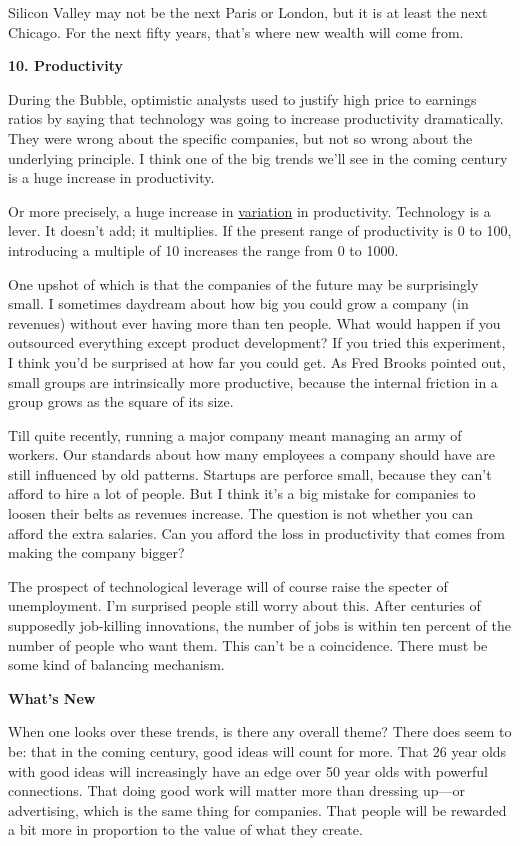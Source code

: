 Silicon Valley may not be the next Paris or London, but it is at least
the next Chicago. For the next fifty years, that's where new wealth will
come from.

\textbf{10. Productivity}

During the Bubble, optimistic analysts used to justify high price to
earnings ratios by saying that technology was going to increase
productivity dramatically. They were wrong about the specific companies,
but not so wrong about the underlying principle. I think one of the big
trends we'll see in the coming century is a huge increase in
productivity.

Or more precisely, a huge increase in \href{gh.html}{variation} in
productivity. Technology is a lever. It doesn't add; it multiplies. If
the present range of productivity is 0 to 100, introducing a multiple of
10 increases the range from 0 to 1000.

One upshot of which is that the companies of the future may be
surprisingly small. I sometimes daydream about how big you could grow a
company (in revenues) without ever having more than ten people. What
would happen if you outsourced everything except product development? If
you tried this experiment, I think you'd be surprised at how far you
could get. As Fred Brooks pointed out, small groups are intrinsically
more productive, because the internal friction in a group grows as the
square of its size.

Till quite recently, running a major company meant managing an army of
workers. Our standards about how many employees a company should have
are still influenced by old patterns. Startups are perforce small,
because they can't afford to hire a lot of people. But I think it's a
big mistake for companies to loosen their belts as revenues increase.
The question is not whether you can afford the extra salaries. Can you
afford the loss in productivity that comes from making the company
bigger?

The prospect of technological leverage will of course raise the specter
of unemployment. I'm surprised people still worry about this. After
centuries of supposedly job-killing innovations, the number of jobs is
within ten percent of the number of people who want them. This can't be
a coincidence. There must be some kind of balancing mechanism.

\textbf{What's New}

When one looks over these trends, is there any overall theme? There does
seem to be: that in the coming century, good ideas will count for more.
That 26 year olds with good ideas will increasingly have an edge over 50
year olds with powerful connections. That doing good work will matter
more than dressing up---or advertising, which is the same thing for
companies. That people will be rewarded a bit more in proportion to the
value of what they create.

